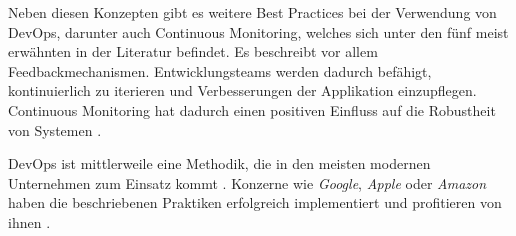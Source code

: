 Neben diesen Konzepten gibt es weitere Best Practices bei der Verwendung von DevOps, darunter auch Continuous Monitoring, welches sich unter den fünf meist erwähnten in der Literatur befindet. Es beschreibt vor allem Feedbackmechanismen. Entwicklungsteams werden dadurch befähigt, kontinuierlich zu iterieren und Verbesserungen der Applikation einzupflegen. Continuous Monitoring hat dadurch einen positiven Einfluss auf die Robustheit von Systemen \cite{012:Compare-and-Contrast-various-Software-Development-Methodologies}.

DevOps ist mittlerweile eine Methodik, die in den meisten modernen Unternehmen zum Einsatz kommt \cite{020:Assessing-and-Improving-Quality-of-Docker-Artifacts}. Konzerne wie \textit{Google}, \textit{Apple} oder \textit{Amazon} haben die beschriebenen Praktiken erfolgreich implementiert und profitieren von ihnen \cite{001:DevOps-Adoption-in-Software-Development}.

